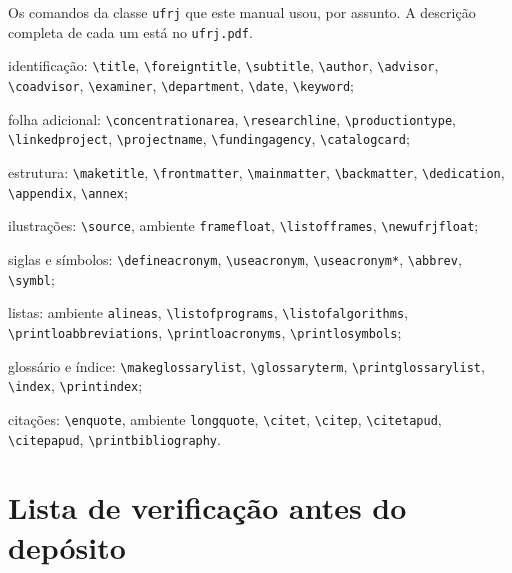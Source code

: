 \documentclass[dsc]{ufrj}
\begin{document}
  Os comandos da classe \texttt{ufrj} que este manual usou, por assunto. A descrição
  completa de cada um está no \texttt{ufrj.pdf}.

  \begin{alineas}\raggedright
    \item identificação: \verb|\title|, \verb|\foreigntitle|, \verb|\subtitle|,
      \verb|\author|, \verb|\advisor|, \verb|\coadvisor|, \verb|\examiner|,
      \verb|\department|, \verb|\date|, \verb|\keyword|;
    \item folha adicional: \verb|\concentrationarea|, \verb|\researchline|,
      \verb|\productiontype|, \verb|\linkedproject|, \verb|\projectname|,
      \verb|\fundingagency|, \verb|\catalogcard|;
    \item estrutura: \verb|\maketitle|, \verb|\frontmatter|, \verb|\mainmatter|,
      \verb|\backmatter|, \verb|\dedication|, \verb|\appendix|, \verb|\annex|;
    \item ilustrações: \verb|\source|, ambiente \verb|framefloat|,
      \verb|\listofframes|, \verb|\newufrjfloat|;
    \item siglas e símbolos: \verb|\defineacronym|, \verb|\useacronym|, \verb|\useacronym*|,
      \verb|\abbrev|, \verb|\symbl|;
    \item listas: ambiente \verb|alineas|, \verb|\listofprograms|,
      \verb|\listofalgorithms|, \verb|\printloabbreviations|,
      \verb|\printloacronyms|, \verb|\printlosymbols|;
    \item glossário e índice: \verb|\makeglossarylist|, \verb|\glossaryterm|,
      \verb|\printglossarylist|, \verb|\index|, \verb|\printindex|;
    \item citações: \verb|\enquote|, ambiente \verb|longquote|, \verb|\citet|,
      \verb|\citep|, \verb|\citetapud|, \verb|\citepapud|,
      \verb|\printbibliography|.
  \end{alineas}

  \chapter{Lista de verificação antes do depósito}
\end{document}
